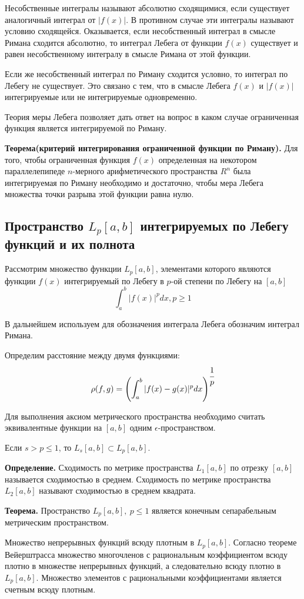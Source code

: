 \documentclass[14pt]{extarticle}
\theoremstyle{definition}
\theoremstyle{remark}
\renewcommand{\[}{\begin{dmath*}[compact]}
\renewcommand{\]}{\end{dmath*}}
\newcommand{\sep}{ , \ \allowbreak }
\newcommand{\tth}[1][]{\textbf{Теорема#1.}}
\newcommand{\tdef}{\textbf{Определение.} }
\begin{document}
Несобственные интегралы называют абсолютно сходящимися, если существует аналогичный интеграл от $|f(x)|$. В противном случае эти интегралы называют условию сходящейся. Оказывается, если несобственный интеграл в смысле Римана сходится абсолютно, то интеграл Лебега от функции $f(x)$ существует и равен несобственному интегралу в смысле Римана от этой функции.

Если же несобственный интеграл по Риману сходится условно, то интеграл по Лебегу не существует. Это связано с тем, что в смысле Лебега $f(x)$ и $|f(x)|$ интегрируемые или не интегрируемые одновременно.

Теория меры Лебега позволяет дать ответ на вопрос в каком случае ограниченная функция является интегрируемой по Риману.

\tth[(критерий интегрирования ограниченной функции по Риману)] Для того, чтобы ограниченная функция $f(x)$ определенная на некотором параллелепипеде $n$-мерного арифметического пространства $R^n$ была интегрируемая по Риману необходимо и достаточно, чтобы мера Лебега множества точки разрыва этой функции равна нулю.

\subsection{Пространство $L_p[a,b]$ интегрируемых по Лебегу функций и их полнота}

Рассмотрим множество функции $L_p[a,b]$, элементами которого являются функции $f(x)$ интегрируемый по Лебегу в $p$-ой степени по Лебегу на $[a,b]$
\[\int_a^b |f(x)|^p dx, p \geq 1\]

В дальнейшем используем для обозначения интеграла Лебега обозначим интеграл Римана.

Определим расстояние между двумя функциями:
\[\rho(f,g)= \left( \int_a^b |f(x) - g(x)|^p dx \right) ^{\cfrac{1}{p}}\]

Для выполнения аксиом метрического пространства необходимо считать эквивалентные функции на $[a,b]$ одним $\epsilon$-пространством.

Если $s>p\leq 1$, то $L_s[a,b] \subset L_p[a,b]$.

\tdef Сходимость по метрике пространства $L_1[a,b]$ по отрезку $[a,b]$ называется сходимостью в среднем.
Сходимость по метрике пространства $L_2[a,b]$ называют сходимостью в среднем квадрата.

\tth[] Пространство $L_p[a,b] \sep p \leq 1$ является конечным сепарабельным метрическим пространством.

Множество непрерывных функций всюду плотным в $L_p[a,b]$. Согласно теореме Вейерштрасса множество многочленов с рациональным коэффициентом всюду плотно в множестве непрерывных функций, а следовательно всюду плотно в $L_p[a,b]$. Множество элементов с рациональными коэффициентами является счетным всюду плотным.
\end{document}
